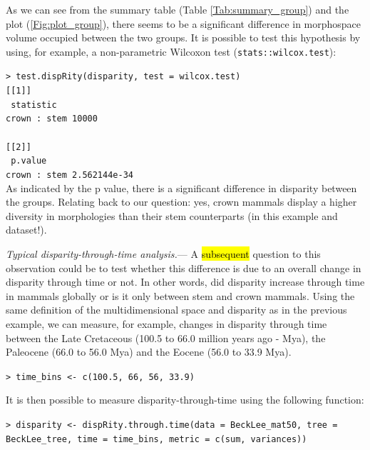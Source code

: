 \documentclass[12pt,letterpaper]{article}
\renewcommand{\subsubsection}[1]{%
\vspace{2ex}
\noindent
\textit{#1.}---}
\begin{document}
As we can see from the summary table (Table \ref{Tab:summary_group}) and the plot (\ref{Fig:plot_group}), there seems to be a significant difference in morphospace volume occupied between the two groups.
It is possible to test this hypothesis by using, for example, a non-parametric Wilcoxon test (\texttt{stats::wilcox.test}):

\noindent \texttt{> test.dispRity(disparity, test = wilcox.test)}\\

\noindent \texttt{[[1]]}\\
\noindent \texttt{             statistic}\\
\noindent \texttt{crown : stem     10000}\\
\noindent \texttt{ }\\
\noindent \texttt{[[2]]}\\
\noindent \texttt{                  p.value}\\
\noindent \texttt{crown : stem 2.562144e-34}\\

\bigskip
As indicated by the p value, there is a significant difference in disparity between the groups.
Relating back to our question: yes, crown mammals display a higher diversity in morphologies than their stem counterparts (in this example and dataset!).

\subsubsection{Typical disparity-through-time analysis}
A 
\hl{subsequent} 
question to this observation could be to test whether this difference is due to an overall change in disparity through time or not.
In other words, did disparity increase through time in mammals globally or is it only between stem and crown mammals.
Using the same definition of the multidimensional space and disparity as in the previous example, we can measure, for example, changes in disparity through time between the Late Cretaceous (100.5 to 66.0 million years ago - Mya), the Paleocene (66.0 to 56.0 Mya) and the Eocene (56.0 to 33.9 Mya).

\noindent \texttt{> time\_bins <- c(100.5, 66, 56, 33.9)}

It is then possible to measure disparity-through-time using the following function:

\noindent \texttt{> disparity <- dispRity.through.time(data = BeckLee\_mat50, tree = BeckLee\_tree, time = time\_bins, metric = c(sum, variances))}
\end{document}

